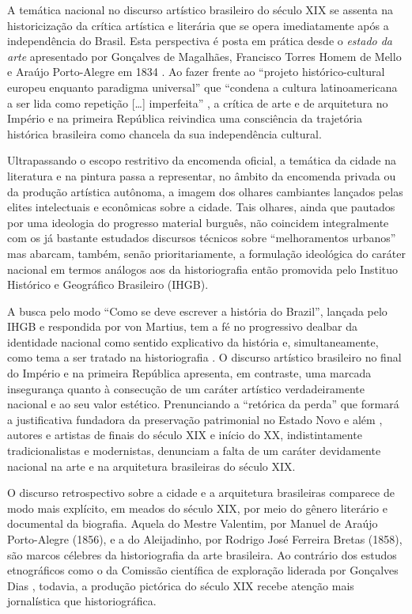 A temática nacional no discurso artístico brasileiro do século XIX se
assenta na historicização da crítica artística e literária que se opera
imediatamente após a independência do Brasil. Esta perspectiva é posta
em prática desde o \emph{estado da arte} apresentado por Gonçalves de
Magalhães, Francisco Torres Homem de Mello e Araújo Porto-Alegre em 1834
\autocite{magalhaes:1834resume}. Ao fazer frente ao ``projeto
histórico-cultural europeu enquanto paradigma universal'' que ``condena
a cultura latinoamericana a ser lida como repetição {[}\ldots{]}
imperfeita'' \autocite[p.~360--361]{dallemand:1996urban15}, a crítica de
arte e de arquitetura no Império e na primeira República reivindica uma
consciência da trajetória histórica brasileira como chancela da sua
independência cultural.

Ultrapassando o escopo restritivo da encomenda oficial, a temática da
cidade na literatura e na pintura passa a representar, no âmbito da
encomenda privada ou da produção artística autônoma, a imagem dos
olhares cambiantes lançados pelas elites intelectuais e econômicas sobre
a cidade. Tais olhares, ainda que pautados por uma ideologia do
progresso material burguês, não coincidem integralmente com os já
bastante estudados discursos técnicos sobre ``melhoramentos urbanos''
\autocite{salgueiro:2001cidades} mas abarcam, também, senão
prioritariamente, a formulação ideológica do caráter nacional em termos
análogos aos da historiografia então promovida pelo Instituo Histórico e
Geográfico Brasileiro (IHGB).

A busca pelo modo ``Como se deve escrever a história do Brazil'',
lançada pelo IHGB e respondida por von Martius, tem a fé no progressivo
dealbar da identidade nacional como sentido explicativo da história e,
simultaneamente, como tema a ser tratado na historiografia
\autocite[p.~402]{martius:1845se6}. O discurso artístico brasileiro no
final do Império e na primeira República apresenta, em contraste, uma
marcada insegurança quanto à consecução de um caráter artístico
verdadeiramente nacional e ao seu valor estético. Prenunciando a
``retórica da perda'' que formará a justificativa fundadora da
preservação patrimonial no Estado Novo e além
\autocite[p.~90]{goncalves:1996retorica}, autores e artistas de finais
do século XIX e início do XX, indistintamente tradicionalistas e
modernistas, denunciam a falta de um caráter devidamente nacional na
arte e na arquitetura brasileiras do século XIX.

O discurso retrospectivo sobre a cidade e a arquitetura brasileiras
comparece de modo mais explícito, em meados do século XIX, por meio do
gênero literário e documental da biografia. Aquela do Mestre Valentim,
por Manuel de Araújo Porto-Alegre (1856), e a do Aleijadinho, por
Rodrigo José Ferreira Bretas (1858), são marcos célebres da
historiografia da arte brasileira. Ao contrário dos estudos etnográficos
como o da Comissão científica de exploração liderada por Gonçalves Dias
\autocite{kury:2001comissao}, todavia, a produção pictórica do século
XIX recebe atenção mais jornalística que historiográfica.

